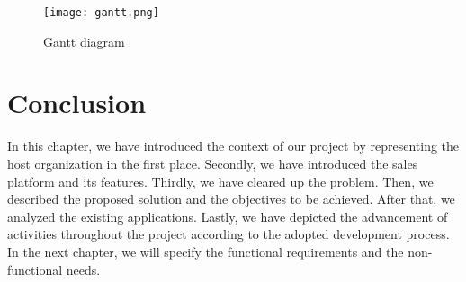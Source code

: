\begin{figure}[H]%
    \center   
    \texttt{[image: gantt.png]}
    \caption{Gantt diagram}
    \label{timeline}
\end{figure}
\section*{Conclusion}
In this chapter, we have introduced the context of our project by representing the host organization in the first place. Secondly, we have introduced the sales platform and its features. Thirdly, we have
cleared up the problem. Then, we described the proposed solution and
the objectives to be achieved. After that, we analyzed the existing applications. Lastly, we have depicted the advancement of
activities throughout the project according to the adopted development process.
In the next chapter, we will specify the functional requirements and the
non-functional needs.